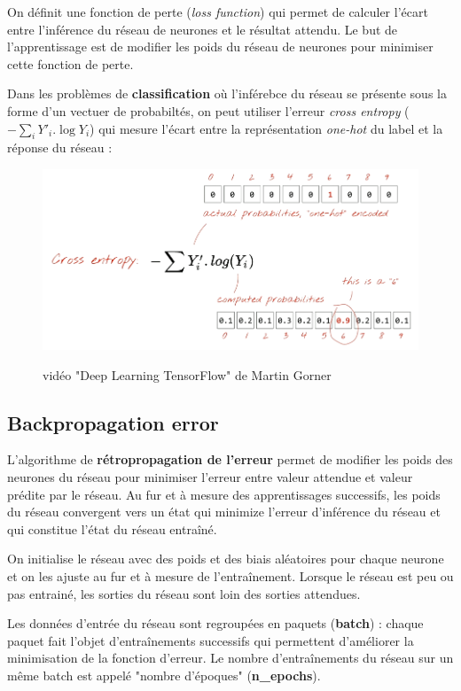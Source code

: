 \documentclass{article}
\begin{document}
On définit une fonction de perte (\textit{loss function}) qui permet de calculer l'écart entre 
l'inférence du réseau de neurones et le résultat attendu. 
Le but de l'apprentissage est de modifier les poids du réseau 
de neurones pour minimiser cette fonction de perte.

Dans les problèmes de \textbf{classification} où l'inférebce du réseau se présente 
sous la forme d'un vectuer de probabiltés, on peut utiliser l'erreur \textit{cross entropy}
($-\sum_i{Y'_i.\log{Y_i}}$) qui mesure l'écart entre la représentation 
\textit{one-hot} du label et la réponse du réseau :


\begin{figure}[H]
\centering
\includegraphics[width=1\textwidth]{img/CrossEntropy.png}

\medskip
vidéo "Deep Learning TensorFlow" de Martin Gorner
\end{figure}


\subsection{Backpropagation error}

L'algorithme de \textbf{rétropropagation de l'erreur} permet de modifier les poids 
des neurones du réseau pour minimiser l'erreur entre valeur attendue et 
valeur prédite par le réseau. 
Au fur et à mesure des apprentissages successifs, les poids du réseau convergent 
vers un état qui minimize l'erreur d'inférence du réseau et qui constitue
 l'état du réseau entraîné.

On initialise le réseau avec des poids et des biais aléatoires pour chaque neurone
et on les ajuste au fur et à mesure de l'entraînement. 
Lorsque le réseau est peu ou pas entrainé, les sorties du réseau sont loin des sorties attendues. 

Les données d'entrée du réseau sont regroupées en paquets (\textbf{batch}) : 
chaque paquet fait l'objet d'entraînements successifs qui permettent 
d'améliorer la minimisation de la fonction d'erreur. 
Le nombre d'entraînements du réseau sur un même batch est 
appelé "nombre d'époques" (\textbf{n\_epochs}).
\end{document}

